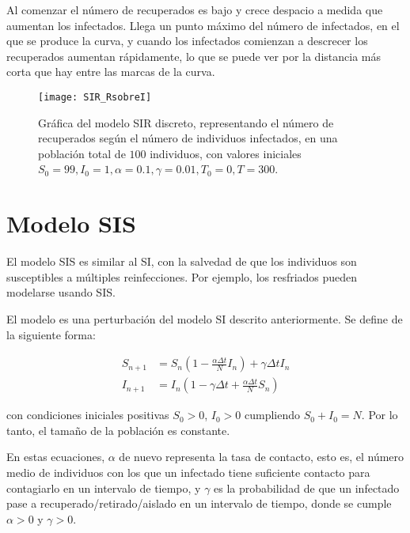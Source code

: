 Al comenzar el número de recuperados es bajo y crece despacio a medida que aumentan los infectados. Llega un punto máximo del número de infectados, en el que se produce la curva, y cuando los infectados comienzan a descrecer los recuperados aumentan rápidamente, lo que se puede ver por la distancia más corta que hay entre las marcas de la curva.

\begin{figure}
\begin{center}

\caption{Gráfica del modelo SIR discreto, representando el número de recuperados según el número de individuos infectados, en una población total de $100$ individuos, con valores iniciales $S_0=99, I_0 = 1, \alpha = 0.1, \gamma=0.01, T_0 = 0, T = 300$.}
\label{fig: SIR_RsobreI}
\texttt{[image: SIR\_RsobreI]}
\end{center}
\end{figure}

\section{Modelo SIS}
El modelo SIS es similar al SI, con la salvedad de que los individuos son susceptibles a múltiples reinfecciones.
Por ejemplo, los resfriados pueden modelarse usando SIS.

El modelo es una perturbación del modelo SI descrito anteriormente. Se define de la siguiente forma:

\begin{equation}
\label{eqn: modelo_SIS}
\begin{aligned}
S_{n+1} & = S_n \left(1-\frac{\alpha\Delta t}{N} I_n \right) + \gamma \Delta t I_n \\
I_{n+1} & = I_n \left( 1-\gamma \Delta t + \frac{\alpha\Delta t}{N} S_n \right)
\end{aligned}
\end{equation}

con condiciones iniciales positivas $S_0>0$, $I_0>0$ cumpliendo $S_0+I_0=N$. Por lo tanto, el tamaño de la población es constante.

En estas ecuaciones, $\alpha$ de nuevo representa la tasa de contacto, esto es, el número medio de individuos con los que un infectado tiene suficiente contacto para contagiarlo en un intervalo de tiempo, y $\gamma$ es la probabilidad de que un infectado pase a recuperado/retirado/aislado en un intervalo de tiempo, donde se cumple $\alpha >0$ y $\gamma >0$.


